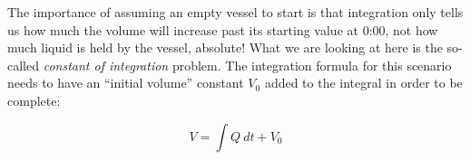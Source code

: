 





The importance of assuming an empty vessel to start is that integration only tells us how much the volume will increase past its starting value at 0:00, not how much liquid is held by the vessel, absolute!  What we are looking at here is the so-called {\it constant of integration} problem.  The integration formula for this scenario needs to have an ``initial volume'' constant $V_0$ added to the integral in order to be complete:

$$V = \int Q \> dt + V_0$$




